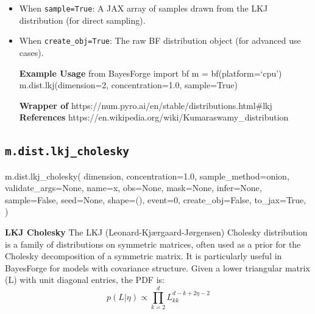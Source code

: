 \documentclass[
  letterpaper,
  DIV=11,
  numbers=noendperiod]{scrartcl}
\newenvironment{Shaded}{\begin{snugshade}}{\end{snugshade}}
\newcommand{\DecValTok}[1]{\textcolor[rgb]{0.68,0.00,0.00}{#1}}
\newcommand{\FloatTok}[1]{\textcolor[rgb]{0.68,0.00,0.00}{#1}}
\newcommand{\NormalTok}[1]{\textcolor[rgb]{0.00,0.23,0.31}{#1}}
\newcommand{\OperatorTok}[1]{\textcolor[rgb]{0.37,0.37,0.37}{#1}}
\newcommand{\StringTok}[1]{\textcolor[rgb]{0.13,0.47,0.30}{#1}}
\newcommand{\VariableTok}[1]{\textcolor[rgb]{0.07,0.07,0.07}{#1}}
\begin{document}
\begin{itemize}
\item
  When \texttt{sample=True}: A JAX array of samples drawn from the LKJ
  distribution (for direct sampling).
\item
  When \texttt{create\_obj=True}: The raw BF distribution object (for
  advanced use cases).

  \textbf{Example Usage} from BayesForge import bf m =
  bf(platform=`cpu') m.dist.lkj(dimension=2, concentration=1.0,
  sample=True)

  \textbf{Wrapper of}
  https://num.pyro.ai/en/stable/distributions.html\#lkj
  \textbf{References}
  https://en.wikipedia.org/wiki/Kumaraswamy\_distribution
\end{itemize}

\subsection{\texorpdfstring{\texttt{m.dist.lkj\_cholesky}}{m.dist.lkj\_cholesky}}\label{lkj_cholesky}

\begin{Shaded}
\begin{Highlighting}[]
\NormalTok{m.dist.lkj\_cholesky(}
\NormalTok{    dimension,}
\NormalTok{    concentration}\OperatorTok{=}\FloatTok{1.0}\NormalTok{,}
\NormalTok{    sample\_method}\OperatorTok{=}\StringTok{\textquotesingle{}onion\textquotesingle{}}\NormalTok{,}
\NormalTok{    validate\_args}\OperatorTok{=}\VariableTok{None}\NormalTok{,}
\NormalTok{    name}\OperatorTok{=}\StringTok{\textquotesingle{}x\textquotesingle{}}\NormalTok{,}
\NormalTok{    obs}\OperatorTok{=}\VariableTok{None}\NormalTok{,}
\NormalTok{    mask}\OperatorTok{=}\VariableTok{None}\NormalTok{,}
\NormalTok{    infer}\OperatorTok{=}\VariableTok{None}\NormalTok{,}
\NormalTok{    sample}\OperatorTok{=}\VariableTok{False}\NormalTok{,}
\NormalTok{    seed}\OperatorTok{=}\VariableTok{None}\NormalTok{,}
\NormalTok{    shape}\OperatorTok{=}\NormalTok{(),}
\NormalTok{    event}\OperatorTok{=}\DecValTok{0}\NormalTok{,}
\NormalTok{    create\_obj}\OperatorTok{=}\VariableTok{False}\NormalTok{,}
\NormalTok{    to\_jax}\OperatorTok{=}\VariableTok{True}\NormalTok{,}
\NormalTok{)}
\end{Highlighting}
\end{Shaded}

\textbf{LKJ Cholesky} The LKJ (Leonard-Kjærgaard-Jørgensen) Cholesky
distribution is a family of distributions on symmetric matrices, often
used as a prior for the Cholesky decomposition of a symmetric matrix. It
is particularly useful in BayesForge for models with covariance
structure. Given a lower triangular matrix (L) with unit diagonal
entries, the PDF is: \[
p(L | \eta) \propto \prod_{k=2}^d L_{kk}^{d-k+2\eta-2}
\]
\end{document}
